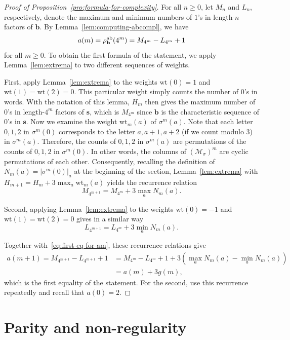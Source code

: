 \documentclass[12pt]{article}
\theoremstyle{plain}
\theoremstyle{definition}
\theoremstyle{remark}
\numberwithin{equation}{section}
\newcommand{\weight}{\mathrm{wt}}
\begin{document}
\begin{proof}[Proof of Proposition~\ref{pro:formula-for-complexity}]
For all $n\ge 0$, let $M_n$ and $L_n$, respectively, denote the maximum and minimum numbers of $1$'s in length-$n$ factors of $\mathbf{b}$.
By Lemma~\ref{lem:computing-abcompl}, we have
\begin{equation}
\label{eq:first-eq-for-am}
a(m) = \rho_{\mathbf{b}}^{\rm ab}(4^m)=M_{4^m}-L_{4^m}+1    
\end{equation}
for all $m\ge 0$.
To obtain the first formula of the statement, we apply Lemma~\ref{lem:extrema} to two different sequences of weights.

First, apply Lemma~\ref{lem:extrema} to the weights $\weight(0)=1$ and $\weight(1)=\weight(2)=0$.
This particular weight simply counts the number of $0$'s in words.
With the notation of this lemma, $H_m$ then gives the maximum number of $0$'s in length-$4^m$ factors of $\mathbf{s}$, which is $M_{4^m}$ since $\mathbf{b}$ is the characteristic sequence of $0$'s in $\mathbf{s}$.
Now we examine the weight $\weight_m(a)$ of $\sigma^m(a)$.
Note that each letter $0,1,2$ in $\sigma^m(0)$ corresponds to the letter $a,a+1,a+2$ (if we count modulo $3$) in $\sigma^m(a)$.
Therefore, the counts of $0,1,2$ in $\sigma^m(a)$ are permutations of the counts of $0,1,2$ in $\sigma^m(0)$. In other words, the columns of $(\mathcal{M}_\sigma)^m$ are cyclic permutations of each other.
Consequently, recalling the definition of $N_m(a)=\lvert\sigma^m(0)\rvert_a$ at the beginning of the section, Lemma~\ref{lem:extrema} with $H_{m+1}=H_m+3\max_a \weight_m(a)$ yields the recurrence relation  
$$M_{4^{m+1}}=M_{4^m}+3\max_a N_m(a).$$

Second, applying Lemma~\ref{lem:extrema} to the weights $\weight(0)=-1$ and $\weight(1)=\weight(2)=0$ gives in a similar way 
$$L_{4^{m+1}}=L_{4^m}+3\min_a N_m(a).$$

Together with~\eqref{eq:first-eq-for-am}, these recurrence relations give
\begin{align*}
a(m+1) 
=  M_{4^{m+1}} - L_{4^{m+1}} +1
&=  M_{4^m} - L_{4^m} + 1 + 3\left(\max_a N_m(a) -\min_ a N_m(a)\right)\\
&= a(m) + 3g(m),
\end{align*}
which is the first equality of the statement.
For the second, use this recurrence repeatedly and recall that $a(0)=2$.
\end{proof}

\section{Parity and non-regularity}
\end{document}
